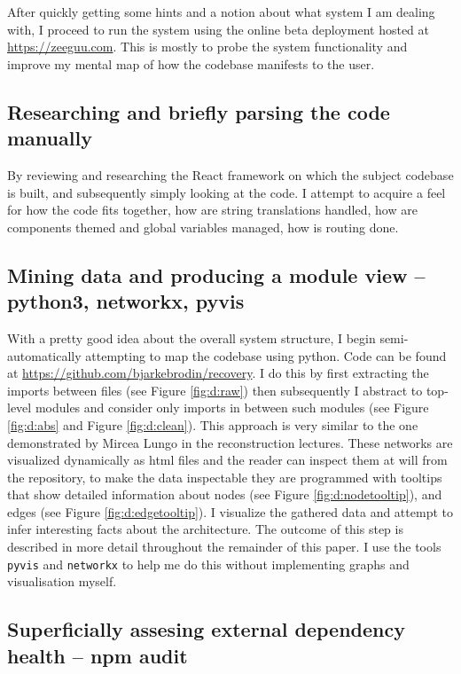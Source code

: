 \documentclass{article}
\begin{document}
After quickly getting some hints and a notion about what system I am dealing with,
I proceed to run the system using the online beta deployment hosted at \href{https://zeeguu.com}{https://zeeguu.com}.
This is mostly to probe the system functionality and improve my mental map of how the codebase manifests to the user.

\subsection{Researching and briefly parsing the code manually}

By reviewing and researching the React framework on which the subject codebase is built,
and subsequently simply looking at the code. 
I attempt to acquire a feel for how the code fits together,
how are string translations handled,
how are components themed and global variables managed,
how is routing done.

\subsection{Mining data and producing a module view -- python3, networkx, pyvis}
\label{mining}

With a pretty good idea about the overall system structure,
I begin semi-automatically attempting to map the codebase using python.
Code can be found at \href{https://github.com/bjarkebrodin/recovery}{https://github.com/bjarkebrodin/recovery}.
I do this by first extracting the imports between files (see Figure \ref{fig:d:raw})
then subsequently I abstract to top-level modules and consider only imports in between such modules (see Figure \ref{fig:d:abs} and Figure \ref{fig:d:clean}).
This approach is very similar to the one demonstrated by Mircea Lungo in the reconstruction lectures\cite{reconstruction}.
These networks are visualized dynamically as html files and the reader can inspect them at will from the repository,
to make the data inspectable they are programmed with tooltips that show detailed information about nodes (see Figure \ref{fig:d:nodetooltip}), and edges (see Figure \ref{fig:d:edgetooltip}).
I visualize the gathered data and attempt to infer interesting facts about the architecture.
The outcome of this step is described in more detail throughout the remainder of this paper.
I use the tools \verb|pyvis|\cite{pyvis} and \verb|networkx|\cite{networkx} to help me do this without implementing graphs and visualisation myself.

\subsection{Superficially assesing external dependency health -- npm audit}
\end{document}
